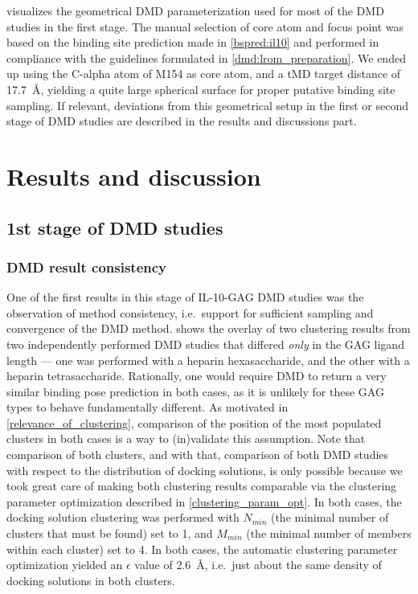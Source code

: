  visualizes the geometrical DMD
parameterization used for most of the DMD studies in the first stage. The manual
selection of core atom and focus point was based on the binding site prediction
made in \cref{bspred:il10} and performed in compliance with the guidelines
formulated in \cref{dmd:lrom_preparation}. We ended up using the C-alpha atom of
M154 as core atom, and a tMD target distance of \SI{17.7}{\angstrom}, yielding a
quite large spherical surface for proper putative binding site sampling. If
relevant, deviations from this geometrical setup in the first or second stage of
DMD studies are described in the results and discussions part.


\section{Results and discussion}

\subsection{1st stage of DMD studies}

\subsubsection{DMD result consistency}

One of the first results in this stage of IL-10-GAG DMD studies was the
observation of method consistency, i.e.\ support for sufficient sampling and
convergence of the DMD method.
 shows the overlay
of two clustering results from two independently performed DMD studies that
differed \textit{only} in the GAG ligand length --- one was performed with a
heparin hexasaccharide, and the other with a heparin tetrasaccharide.
Rationally, one would require DMD to return a very similar binding pose
prediction in both cases, as it is unlikely for these GAG types to behave
fundamentally different. As motivated in \cref{relevance_of_clustering},
comparison of the position of the most populated clusters in both cases is a way
to (in)validate this assumption. Note that comparison of both clusters, and with
that, comparison of both DMD studies with respect to the distribution of docking
solutions, is only possible because we took great care of making both clustering
results comparable via the clustering parameter optimization described in
\cref{clustering_param_opt}. In both cases, the docking solution clustering was
performed with $N_{min}$ (the minimal number of clusters that must be found) set
to 1, and $M_{min}$ (the minimal number of members within each cluster) set to
4. In both cases, the automatic clustering parameter optimization yielded an
   $\epsilon$ value of \SI{2.6}{\angstrom}, i.e.\ just about the same density of
   docking solutions in both clusters.

